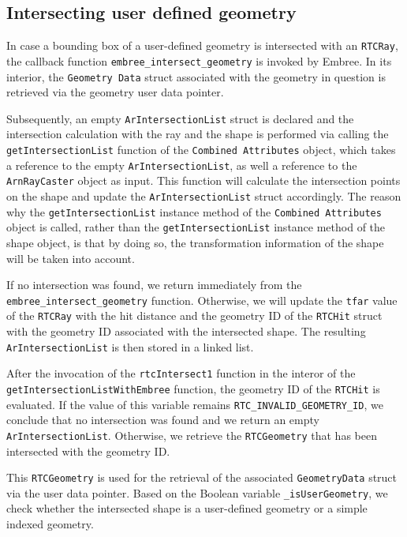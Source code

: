 \subsection{Intersecting user defined geometry}
\label{subsec:instersect}

In case a bounding box of a user-defined geometry is intersected with an \texttt{RTCRay}, the callback function \texttt{embree\_intersect\_geometry} is invoked by Embree. In its interior, the \texttt{Geometry Data} struct associated with the geometry in question is retrieved via the geometry user data pointer. 

Subsequently, an empty \texttt{ArIntersectionList} struct is declared and the intersection calculation with the ray and the shape is performed via calling the \texttt{getIntersectionList} function of the \texttt{Combined Attributes} object, which takes a reference to the empty \texttt{ArIntersectionList}, as well a reference to the \texttt{ArnRayCaster} object as input.
This function will calculate the intersection points on the shape and update the \texttt{ArIntersectionList} struct accordingly. The reason why the \texttt{getIntersectionList} instance method of the \texttt{Combined Attributes} object is called, rather than the \texttt{getIntersectionList} instance method of the shape object, is that by doing so, the transformation information of the shape will be taken into account.

If no intersection was found, we return immediately from the \texttt{embree\_intersect\_geometry} function. Otherwise, we will update the \texttt{tfar} value of the \texttt{RTCRay} with the hit distance and the geometry ID of the \texttt{RTCHit} struct with the geometry ID associated with the intersected shape.
The resulting \texttt{ArIntersectionList} is then stored in a linked list.

After the invocation of the \texttt{rtcIntersect1} function in the interor of the  \texttt{getIntersectionListWithEmbree} function, the geometry ID of the \texttt{RTCHit} is evaluated. If the value of this variable remains \texttt{RTC\_INVALID\_GEOMETRY\_ID}, we conclude that no intersection was found and we return an empty \texttt{ArIntersectionList}. Otherwise, we retrieve the \texttt{RTCGeometry} that has been intersected with the geometry ID.

This \texttt{RTCGeometry} is used for the retrieval of the associated \texttt{GeometryData} struct via the user data pointer. Based on the Boolean variable \texttt{\_isUserGeometry}, we check whether the intersected shape is a user-defined geometry or a simple indexed geometry.

